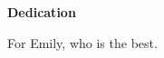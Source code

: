 {}
\begin{center}
  \textbf{Dedication}

  For Emily, who is the best.
\end{center}

\cleardoublepage
